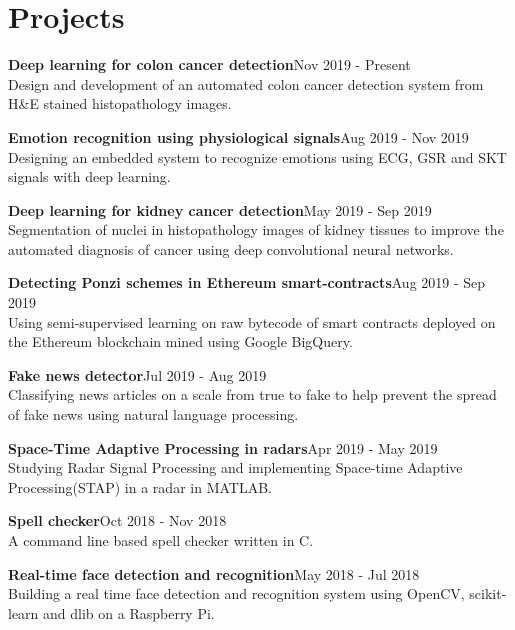 \documentclass[letterpaper]{article}
\renewenvironment{itemize}{
  \begin{list}{}{
    \setlength{\leftmargin}{1.5em}
  }
}{
  \end{list}
}
\begin{document}
\section*{Projects}
  \begin{itemize}
    \item
    \textbf{Deep learning for colon cancer detection}\hfill{Nov 2019 - Present}\\
    Design and development of an automated colon cancer detection system from H\&E stained histopathology images.

    \item
    \textbf{Emotion recognition using physiological signals}\hfill{Aug 2019 - Nov 2019}\\
    Designing an embedded system to recognize emotions using ECG, GSR and SKT signals with deep learning.

    \item
    \textbf{Deep learning for kidney cancer detection}\hfill{May 2019 - Sep 2019}\\
    Segmentation of nuclei in histopathology images of kidney tissues to improve the automated diagnosis of cancer using deep convolutional neural networks.

    \item
    \textbf{Detecting Ponzi schemes in Ethereum smart-contracts}\hfill{Aug 2019 - Sep 2019}\\
    Using semi-supervised learning on raw bytecode of smart contracts deployed on the Ethereum blockchain mined using Google BigQuery.

    \item
    \textbf{Fake news detector}\hfill{Jul 2019 - Aug 2019}\\
    Classifying news articles on a scale from true to fake to help prevent the spread of fake news using natural language processing.

    \item
    \textbf{Space-Time Adaptive Processing in radars}\hfill{Apr 2019 - May 2019}\\
    Studying Radar Signal Processing and implementing Space-time Adaptive Processing(STAP) in a radar in MATLAB.

    \item
    \textbf{Spell checker}\hfill{Oct 2018 - Nov 2018}\\
    A command line based spell checker written in C.

    \item
    \textbf{Real-time face detection and recognition}\hfill{May 2018 - Jul 2018}\\
    Building a real time face detection and recognition system using OpenCV, scikit-learn and dlib on a Raspberry Pi.

  \end{itemize}
\end{document}
